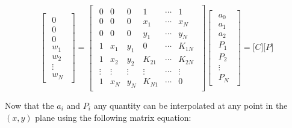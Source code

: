 \begin{equation}
\begin{bmatrix}
  \begin{array}{c}
    0 \\
    0 \\
    0 \\
    \hline
    w_{1} \\
    w_{2} \\
     \vdots \\
    w_{N}        
  \end{array}
\end{bmatrix} = \begin{bmatrix}
\begin{array}{cccccc}
  0 & 0 & 0 & 1 & \cdots & 1 \\
0 & 0 & 0 & x_{1} & \cdots & x_{N} \\
0 & 0 & 0 & y_{1} & \cdots & y_{N} \\
\hline 
1 & x_{1} & y_{1} & 0 & \cdots & K_{1N} \\
1 & x_{2} & y_{2} & K_{21} & \cdots & K_{2N} \\
 \vdots & \vdots & \vdots & \vdots & \cdots & \vdots \\
1 & x_{N} & y_{N} & K_{N1} & \cdots & 0
\end{array}
\end{bmatrix}
\begin{bmatrix}
  \begin{array}{c}
    a_{0} \\
    a_{1} \\
    a_{2} \\
    \hline
    P_{1} \\
    P_{2} \\
     \vdots \\
    P_{N}
        
  \end{array}
\end{bmatrix} = \lbrack C\rbrack\lbrack P\rbrack
\end{equation}



Now that the $a_{i}$ and $P_{i}$ any quantity can be interpolated at
any point in the $(x,y)$ plane using the following matrix equation:

